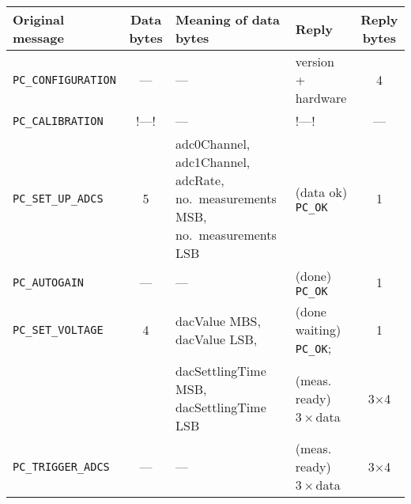 \documentclass[11pt,a4paper,english]{article}
\begin{document}
\begin{center}
\begin{tabular}{lcp{}p{}c}\toprule
Original message            & Data bytes & Meaning of data bytes                    & Reply & Reply bytes\\\midrule
\texttt{PC\_CONFIGURATION}  & ---        & ---								        & \small{version + hardware} & 4\\
\texttt{PC\_CALIBRATION}    & !---!      & ---                                      & !---!                       & ---\\
\texttt{PC\_SET\_UP\_ADCS}  & 5 & adc0Channel, adc1Channel, adcRate, no.\ measurements MSB, no.\ measurements LSB & {\small(data ok)} \texttt{PC\_OK}  & 1\\
\texttt{PC\_AUTOGAIN}       & ---        & ---                                      & {\small(done)} \texttt{PC\_OK}         & 1\\
\texttt{PC\_SET\_VOLTAGE}   & 4          & dacValue MBS, dacValue LSB,   & {\small(done waiting)} \texttt{PC\_OK}; & 1\\
                            &            & dacSettlingTime MSB, dacSettlingTime LSB & {\small(meas. ready) $3\times$data} & 3$\times$4\\
\texttt{PC\_TRIGGER\_ADCS}  & ---        & ---                                      & {\small(meas. ready) $3\times$data} & 3$\times$4\\
\bottomrule
\end{tabular}
\end{center}
\end{document}
